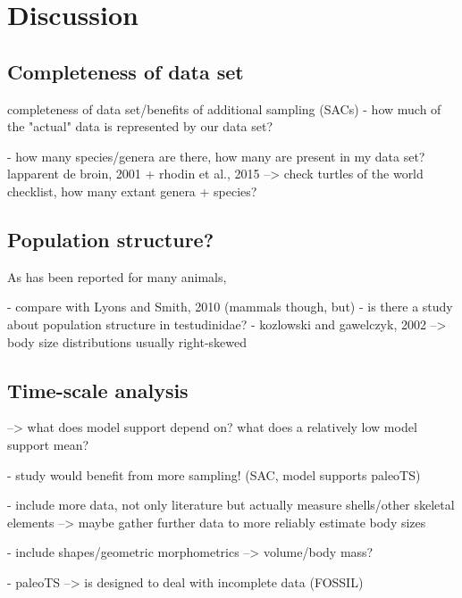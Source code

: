 \section{Discussion}

\subsection{Completeness of data set}

completeness of data set/benefits of additional sampling (SACs)
- how much of the "actual" data is represented by our data set?

- how many species/genera are there, how many are present in my data set?
lapparent de broin, 2001 + rhodin et al., 2015
--> check turtles of the world checklist, how many extant genera + species?


\subsection{Population structure?}

As has been reported for many animals, 

- compare with Lyons and Smith, 2010 (mammals though, but)
- is there a study about population structure in testudinidae?
- kozlowski and gawelczyk, 2002 --> body size distributions usually right-skewed

\subsection{Time-scale analysis}

--> what does model support depend on? what does a relatively low model support mean?




- study would benefit from more sampling! (SAC, model supports paleoTS)

- include more data, not only literature but actually measure shells/other skeletal elements --> maybe gather further data to more reliably estimate body sizes

- include shapes/geometric morphometrics --> volume/body mass?

- paleoTS --> is designed to deal with incomplete data (FOSSIL)

